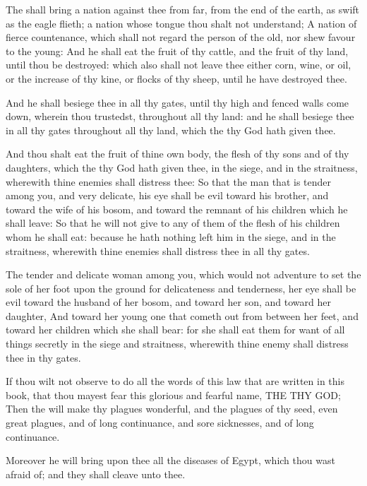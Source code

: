 \verse The \LORD shall bring a nation against thee from far, from the end of the earth, as swift as the eagle flieth; a nation whose tongue thou shalt not understand; \verse A nation of fierce countenance, which shall not regard the person of the old, nor shew favour to the young: \verse And he shall eat the fruit of thy cattle, and the fruit of thy land, until thou be destroyed: which also shall not leave thee either corn, wine, or oil, or the increase of thy kine, or flocks of thy sheep, until he have destroyed thee.

\verse And he shall besiege thee in all thy gates, until thy high and fenced walls come down, wherein thou trustedst, throughout all thy land: and he shall besiege thee in all thy gates throughout all thy land, which the \LORD thy God hath given thee.

\verse And thou shalt eat the fruit of thine own body, the flesh of thy sons and of thy daughters, which the \LORD thy God hath given thee, in the siege, and in the straitness, wherewith thine enemies shall distress thee: \verse So that the man that is tender among you, and very delicate, his eye shall be evil toward his brother, and toward the wife of his bosom, and toward the remnant of his children which he shall leave: \verse So that he will not give to any of them of the flesh of his children whom he shall eat: because he hath nothing left him in the siege, and in the straitness, wherewith thine enemies shall distress thee in all thy gates.

\verse The tender and delicate woman among you, which would not adventure to set the sole of her foot upon the ground for delicateness and tenderness, her eye shall be evil toward the husband of her bosom, and toward her son, and toward her daughter, \verse And toward her young one that cometh out from between her feet, and toward her children which she shall bear: for she shall eat them for want of all things secretly in the siege and straitness, wherewith thine enemy shall distress thee in thy gates.

\verse If thou wilt not observe to do all the words of this law that are written in this book, that thou mayest fear this glorious and fearful name, THE \LORD THY GOD; \verse Then the \LORD will make thy plagues wonderful, and the plagues of thy seed, even great plagues, and of long continuance, and sore sicknesses, and of long continuance.

\verse Moreover he will bring upon thee all the diseases of Egypt, which thou wast afraid of; and they shall cleave unto thee.

